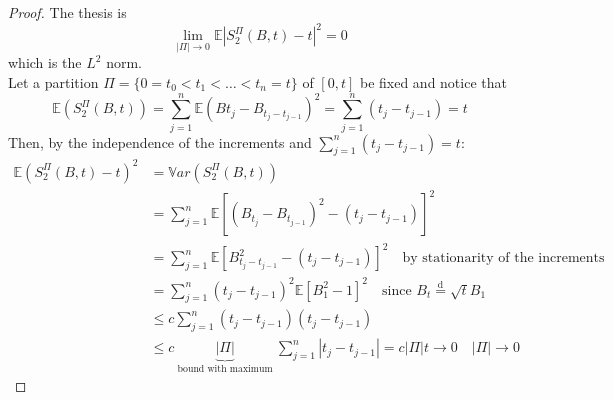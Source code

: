 \begin{ProofBox}
    \begin{proof}
    The thesis is 
    \begin{equation*}
        \lim_{|\Pi| \rightarrow 0} \mathbb{E}|S_2^\Pi(B,t) - t|^2 = 0
    \end{equation*}
    which is the $L^2$ norm. \\
    Let a partition $\Pi = \{0 = t_0 < t_1 < \ldots < t_n = t\}$ of $[0,t]$ be fixed and notice that
    \begin{equation*}
        \mathbb{E}(S_2^\Pi(B,t)) = \sum_{j=1}^n \mathbb{E}(B{t_j} - B_{t_j-t_{j-1}})^2 = \sum_{j=1}^n(t_j-t_{j-1}) = t
    \end{equation*}
    Then, by the independence of the increments and $\sum_{j=1}^n(t_j-t_{j-1}) = t$:
    \begin{align*}
        \mathbb{E}(S_2^\Pi(B,t)-t)^2 &= \mathbb{V}ar(S_2^\Pi(B,t)) \\
        &= \sum_{j=1}^{n} \mathbb{E} [(B_{t_j} - B_{t_{j-1}})^2 - (t_j - t_{j-1})]^2 \\
        &= \sum_{j=1}^{n} \mathbb{E} [B^2_{t_j - t_{j-1}} - (t_j - t_{j-1})]^2 \quad \text{by stationarity of the increments}\\
        &= \sum_{j=1}^{n} (t_j - t_{j-1})^2 \mathbb{E} [B_1^2 - 1]^2 \quad \text{since $B_t \stackrel{\text{d}}=\sqrt{t} B_1$}\\
        &\leq c \sum_{j=1}^{n} (t_j - t_{j-1}) (t_j - t_{j-1}) \\
        & \leq c \underbrace{|\Pi| }_{\text{ bound with maximum }} \sum_{j=1}^{n} |t_j - t_{j-1}| = c |\Pi| t \rightarrow 0 \quad |\Pi| \rightarrow 0
    \end{align*}
\end{proof}
\end{ProofBox}
